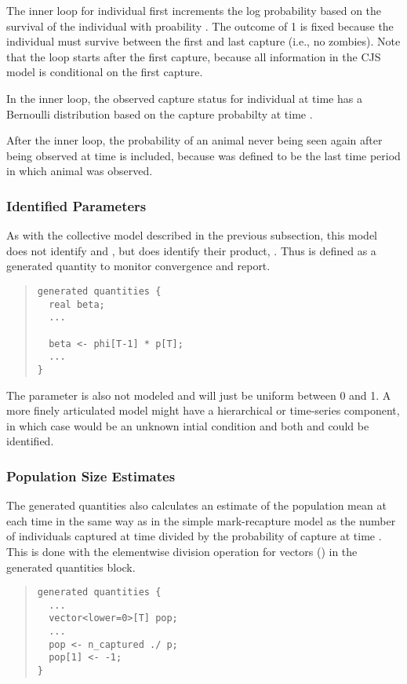 The inner loop for individual  first increments the log
probability based on the survival of the individual with proability
.  The outcome of 1 is fixed because the individual
must survive between the first and last capture (i.e., no zombies).
Note that the loop starts after the first capture, because all
information in the CJS model is conditional on the first capture.

In the inner loop, the observed capture status  for
individual  at time  has a Bernoulli distribution
based on the capture probabilty  at time .

After the inner loop, the probability of an animal never being seen
again after being observed at time  is included, because
 was defined to be the last time period in which animal
 was observed.

\subsubsection{Identified Parameters}

As with the collective model described in the previous subsection,
this model does not identify  and , but
does identify their product, .  Thus  is defined
as a generated quantity to monitor convergence and report.
%
\begin{quote}
\begin{Verbatim}
generated quantities {
  real beta;
  ...

  beta <- phi[T-1] * p[T];
  ...
}
\end{Verbatim}
\end{quote}
%

The parameter  is also not modeled and will just be uniform
between 0 and 1.  A more finely articulated model might have a
hierarchical or time-series component, in which case  would
be an unknown intial condition and both  and
 could be identified.

\subsubsection{Population Size Estimates}

The generated quantities also calculates an estimate of the population
mean at each time  in the same way as in the simple
mark-recapture model as the number of individuals captured at time
 divided by the probability of capture at time .  This
is done with the elementwise division operation for vectors
() in the generated quantities block.
%
\begin{quote}
\begin{Verbatim}
generated quantities {
  ...
  vector<lower=0>[T] pop;
  ...
  pop <- n_captured ./ p;
  pop[1] <- -1;
}
\end{Verbatim}
\end{quote}

